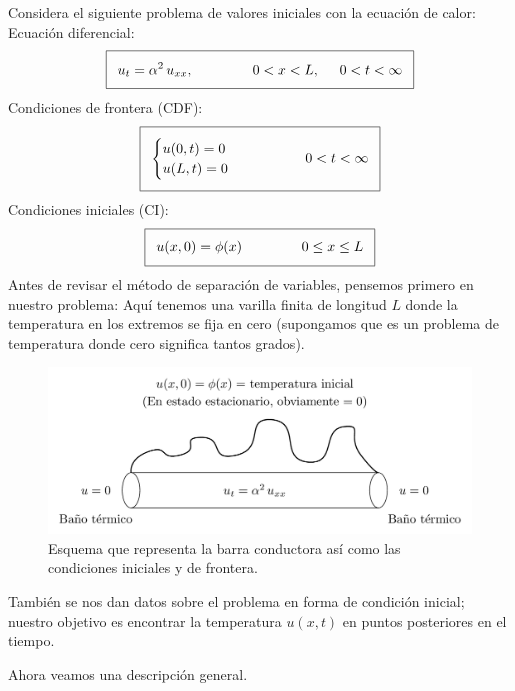 Considera el siguiente problema de valores iniciales con la ecuación de calor:
\\
Ecuación diferencial:
\begin{align*}
\addtolength{\fboxsep}{5pt}\boxed{ u_{t} = \alpha^{2} \, u_{xx}, \hspace{1.5cm} 0 < x < L,\hspace{0.5cm} 0 < t < \infty}
\end{align*}
Condiciones de frontera (CDF):
\begin{align*}
\addtolength{\fboxsep}{5pt}\boxed{
\begin{cases}
u (0, t) = 0 \\
u (L, t) = 0
\end{cases}
\hspace{1.5cm}
0 < t < \infty }
\end{align*}
Condiciones iniciales (CI):
\begin{align*}
\addtolength{\fboxsep}{5pt}\boxed{
u (x, 0) = \phi (x) \hspace{1.5cm} 0 \leq x \leq L
}
\end{align*}
Antes de revisar el método de separación de variables, pensemos primero en nuestro problema: Aquí tenemos una varilla finita de longitud $L$ donde la temperatura en los extremos se fija en cero (supongamos que es un problema de temperatura donde cero significa tantos grados). 
\begin{figure}[H]
    \centering
    \includegraphics[scale=0.25]{Imagenes/Separacion_Variables_00_Barra.png}
    \caption{Esquema que representa la barra conductora así como las condiciones iniciales y de frontera.}
    \label{fig:figura_barra_01}
\end{figure}

También se nos dan datos sobre el problema en forma de condición inicial; nuestro objetivo es encontrar la temperatura $u (x, t)$ en puntos posteriores en el tiempo.

Ahora veamos una descripción general.

